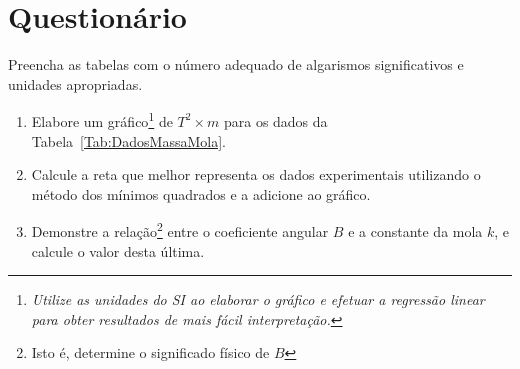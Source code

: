 \cleardoublepage


\vspace{15mm}

\begin{fullwidth}
\noindent{}
\vspace{5mm}

\noindent{}

\noindent{}

\noindent{}

\noindent{}

\noindent{}
\end{fullwidth}

\vspace{5mm}

\section{Questionário}

\begin{question}[type={exam}]
Preencha as tabelas com o número adequado de algarismos significativos e unidades apropriadas. 
\end{question}

\begin{question}[type={exam}]
\begin{enumerate}[label=\roman*.]
\item Elabore um gráfico\footnote{\emph{Utilize as unidades do SI ao elaborar o gráfico e efetuar a regressão linear para obter resultados de mais fácil interpretação.}} de $T^2 \times m$ para os dados da Tabela~\ref{Tab:DadosMassaMola}.
\item Calcule a reta que melhor representa os dados experimentais utilizando o método dos mínimos quadrados e a adicione ao gráfico.
\item Demonstre a relação\footnote{Isto é, determine o significado físico de $B$} entre o coeficiente angular $B$ e a constante da mola $k$, e calcule o valor desta última.
\end{enumerate}
\end{question}

